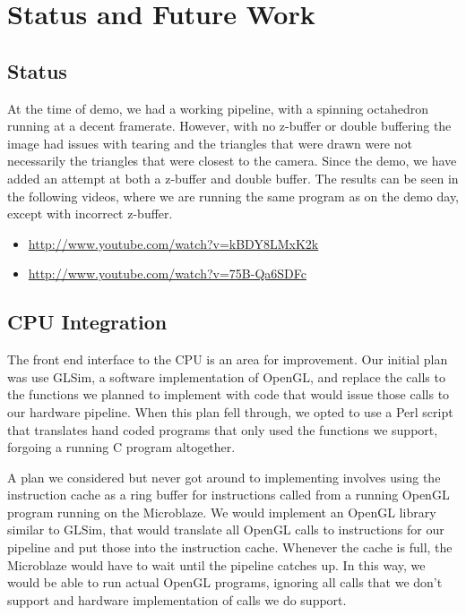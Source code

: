 \documentclass[letterpaper,10pt]{article}
\begin{document}
\section{Status and Future Work}

\subsection{Status}
At the time of demo, we had a working pipeline, with a spinning octahedron running at a decent framerate. However, with no z-buffer or double buffering the image had issues with tearing and the triangles that were drawn were not necessarily the triangles that were closest to the camera. 
Since the demo, we have added an attempt at both a z-buffer and double buffer. The results can be seen in the following videos, where we are running the same program as on the demo day, except with incorrect z-buffer. 
\begin{itemize}

\item \url{http://www.youtube.com/watch?v=kBDY8LMxK2k}

\item \url{http://www.youtube.com/watch?v=75B-Qa6SDFc} 

\end{itemize}



\subsection{CPU Integration}
The front end interface to the CPU is an area for improvement. Our initial plan was use GLSim, a software implementation of OpenGL, and replace the calls to the functions we planned to implement with code that would issue those calls to our hardware pipeline. When this plan fell through, we opted to use a Perl script that translates hand coded programs that only used the functions we support, forgoing a running C program altogether.

A plan we considered but never got around to implementing involves using the instruction cache as a ring buffer for instructions called from a running OpenGL program running on the Microblaze. We would implement an OpenGL library similar to GLSim, that would translate all OpenGL calls to instructions for our pipeline and put those into the instruction cache. Whenever the cache is full, the Microblaze would have to wait until the pipeline catches up. In this way, we would be able to run actual OpenGL programs, ignoring all calls that we don't support and hardware implementation of calls we do support.
\end{document}
